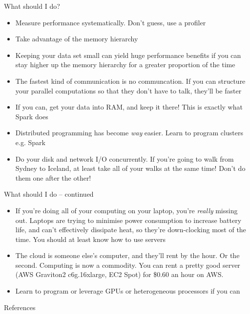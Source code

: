 \documentclass{beamer}
\begin{document}
\begin{frame}{What should I do?}
	\begin{itemize}
		\item Measure performance systematically. Don't guess, use a profiler
		
		\item Take advantage of the memory hierarchy

		\item Keeping your data set small can yield huge performance benefits
		if you can stay higher up the memory hierarchy for a greater proportion
		of the time

		\item The fastest kind of communication is no communcation. If you can
		structure your parallel computations so that they don't have to talk, they'll
		be faster

		\item If you can, get your data into RAM, and keep it there! This is exactly what
		Spark does

		\item Distributed programming has become \emph{way} easier. Learn to program
		clusters e.g. Spark

		\item Do your disk and network I/O concurrently. If you're going to walk
		from Sydney to Iceland, at least take all of your walks at the same time!
		Don't do them one after the other!

	\end{itemize}
\end{frame}

\begin{frame}{What should I do -- continued}
	\begin{itemize}
		\item If you're doing all of your computing on your laptop, you're \emph{really}
		missing out. Laptops are trying to minimise power consumption to increase battery life, and
		can't effectively dissipate heat, so they're down-clocking most of the time.
		You should at least know how to use servers

		\item The cloud is someone else's computer, and they'll rent by the
		hour. Or the second. Computing is now a commodity. You can rent a pretty
		good server (AWS Graviton2 c6g.16xlarge, EC2 Spot) for \$0.60 an hour on
		AWS. 

		\item Learn to program or leverage GPUs or heterogeneous processors if you can
		
	\end{itemize}
\end{frame}

\begin{frame}{References}


\end{frame}
\end{document}

